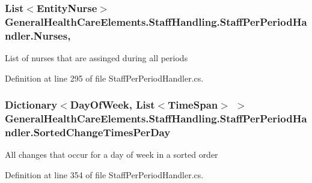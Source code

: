 \subsubsection[{\texorpdfstring{Nurses}{Nurses}}]{\setlength{\rightskip}{0pt plus 5cm}List$<${\bf Entity\+Nurse}$>$ General\+Health\+Care\+Elements.\+Staff\+Handling.\+Staff\+Per\+Period\+Handler.\+Nurses\hspace{0.3cm}{\ttfamily [get]}, {\ttfamily [set]}}\hypertarget{class_general_health_care_elements_1_1_staff_handling_1_1_staff_per_period_handler_a5831e4dde01957b4c474a4416b945b96}{}\label{class_general_health_care_elements_1_1_staff_handling_1_1_staff_per_period_handler_a5831e4dde01957b4c474a4416b945b96}


List of nurses that are assinged during all periods 



Definition at line 295 of file Staff\+Per\+Period\+Handler.\+cs.

\subsubsection[{\texorpdfstring{Sorted\+Change\+Times\+Per\+Day}{SortedChangeTimesPerDay}}]{\setlength{\rightskip}{0pt plus 5cm}Dictionary$<$Day\+Of\+Week, List$<$Time\+Span$>$ $>$ General\+Health\+Care\+Elements.\+Staff\+Handling.\+Staff\+Per\+Period\+Handler.\+Sorted\+Change\+Times\+Per\+Day\hspace{0.3cm}{\ttfamily [get]}}\hypertarget{class_general_health_care_elements_1_1_staff_handling_1_1_staff_per_period_handler_a5306c250e4dd755c8e618712ccb5e660}{}\label{class_general_health_care_elements_1_1_staff_handling_1_1_staff_per_period_handler_a5306c250e4dd755c8e618712ccb5e660}


All changes that occur for a day of week in a sorted order 



Definition at line 354 of file Staff\+Per\+Period\+Handler.\+cs.

